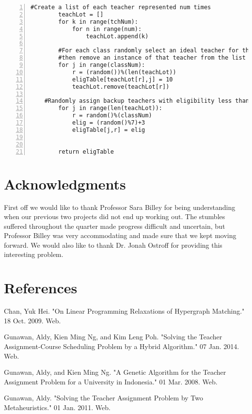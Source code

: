 \documentclass[11pt]{article}
\begin{document}
\begin{lstlisting}[numbers=left,numberstyle=\tiny,numbersep=0pt]
        #Create a list of each teacher represented num times
        teachLot = []
        for k in range(tchNum):
            for n in range(num):
                teachLot.append(k)
            
        #For each class randomly select an ideal teacher for that class
        #then remove an instance of that teacher from the list   
        for j in range(classNum):
            r = (random())%(len(teachLot))
            eligTable[teachLot[r],j] = 10
            teachLot.remove(teachLot[r])
        
   	#Randomly assign backup teachers with eligibility less than 10
        for j in range(len(teachLot)):
            r = random()%(classNum)
            elig = (random()%7)+3
            eligTable[j,r] = elig


        return eligTable
\end{lstlisting}


\section{Acknowledgments}
First off we would like to thank Professor Sara Billey for being understanding when our previous two projects did not end up working out. The stumbles suffered throughout the quarter made progress difficult and uncertain, but Professor Billey was very accommodating and made sure that we kept moving forward. We would also like to thank Dr. Jonah Ostroff for providing this interesting problem. 

\section{References}
Chan, Yuk Hei. "On Linear Programming Relaxations of Hypergraph Matching." 18 Oct. 2009. Web.

Gunawan, Aldy, Kien Ming Ng, and Kim Leng Poh. "Solving the Teacher Assignment-Course Scheduling Problem by a Hybrid Algorithm." 07 Jan. 2014. Web.

Gunawan, Aldy, and Kien Ming Ng. "A Genetic Algorithm for the Teacher Assignment Problem for a University in Indonesia." 01 Mar. 2008. Web.

Gunawan, Aldy. "Solving the Teacher Assignment Problem by Two Metaheuristics." 01 Jan. 2011. Web.
\end{document}
